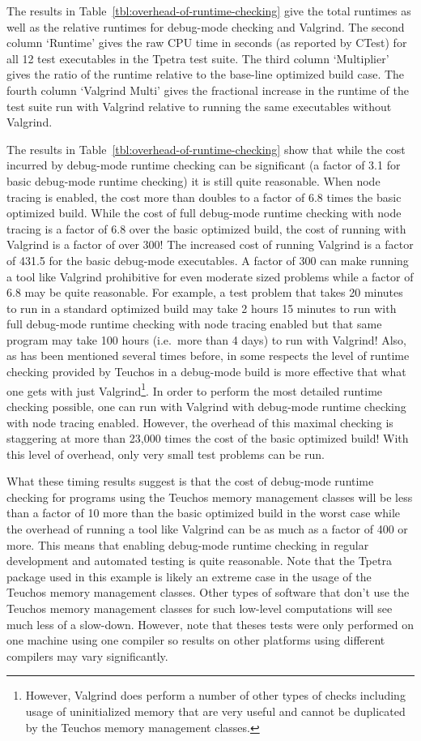 \documentclass[pdf,ps2pdf,11pt]{SANDreport}
\begin{document}
The results in Table~\ref{tbl:overhead-of-runtime-checking} give the
total runtimes as well as the relative runtimes for debug-mode
checking and Valgrind.  The second column `Runtime' gives the raw CPU
time in seconds (as reported by CTest) for all 12 test executables in
the Tpetra test suite.  The third column `Multiplier' gives the ratio
of the runtime relative to the base-line optimized build case.  The
fourth column `Valgrind Multi' gives the fractional increase in the
runtime of the test suite run with Valgrind relative to running the
same executables without Valgrind.

The results in Table~\ref{tbl:overhead-of-runtime-checking} show that
while the cost incurred by debug-mode runtime checking can be
significant (a factor of 3.1 for basic debug-mode runtime checking) it
is still quite reasonable.  When node tracing is enabled, the cost
more than doubles to a factor of 6.8 times the basic optimized build.
While the cost of full debug-mode runtime checking with node tracing
is a factor of 6.8 over the basic optimized build, the cost of running
with Valgrind is a factor of over 300!  The increased cost of running
Valgrind is a factor of 431.5 for the basic debug-mode executables.  A
factor of 300 can make running a tool like Valgrind prohibitive for
even moderate sized problems while a factor of 6.8 may be quite
reasonable.  For example, a test problem that takes 20 minutes to run
in a standard optimized build may take 2 hours 15 minutes to run with
full debug-mode runtime checking with node tracing enabled but that
same program may take 100 hours (i.e.\ more than 4 days) to run with
Valgrind!  Also, as has been mentioned several times before, in some
respects the level of runtime checking provided by Teuchos in a
debug-mode build is more effective that what one gets with just
Valgrind\footnote{However, Valgrind does perform a number of other
types of checks including usage of uninitialized memory that are very
useful and cannot be duplicated by the Teuchos memory management
classes.}.  In order to perform the most detailed runtime checking
possible, one can run with Valgrind with debug-mode runtime checking
with node tracing enabled.  However, the overhead of this maximal
checking is staggering at more than 23,000 times the cost of the basic
optimized build!  With this level of overhead, only very small test
problems can be run.

What these timing results suggest is that the cost of debug-mode
runtime checking for programs using the Teuchos memory management
classes will be less than a factor of 10 more than the basic optimized
build in the worst case while the overhead of running a tool like
Valgrind can be as much as a factor of 400 or more.  This means that
enabling debug-mode runtime checking in regular development and
automated testing is quite reasonable.  Note that the Tpetra package
used in this example is likely an extreme case in the usage of the
Teuchos memory management classes.  Other types of software that don't
use the Teuchos memory management classes for such low-level
computations will see much less of a slow-down.  However, note that
theses tests were only performed on one machine using one compiler so
results on other platforms using different compilers may vary
significantly.
\end{document}
